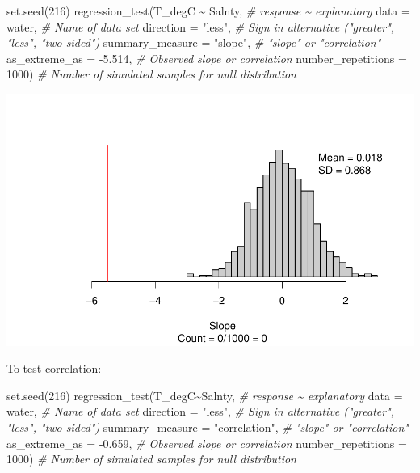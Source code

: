\documentclass[
]{report}
\newenvironment{Shaded}{\begin{snugshade}}{\end{snugshade}}
\newcommand{\AttributeTok}[1]{\textcolor[rgb]{0.77,0.63,0.00}{#1}}
\newcommand{\CommentTok}[1]{\textcolor[rgb]{0.56,0.35,0.01}{\textit{#1}}}
\newcommand{\DecValTok}[1]{\textcolor[rgb]{0.00,0.00,0.81}{#1}}
\newcommand{\FloatTok}[1]{\textcolor[rgb]{0.00,0.00,0.81}{#1}}
\newcommand{\FunctionTok}[1]{\textcolor[rgb]{0.00,0.00,0.00}{#1}}
\newcommand{\NormalTok}[1]{#1}
\newcommand{\SpecialCharTok}[1]{\textcolor[rgb]{0.00,0.00,0.00}{#1}}
\newcommand{\StringTok}[1]{\textcolor[rgb]{0.31,0.60,0.02}{#1}}
\begin{document}
\begin{Shaded}
\begin{Highlighting}[]
\FunctionTok{set.seed}\NormalTok{(}\DecValTok{216}\NormalTok{)}
\FunctionTok{regression\_test}\NormalTok{(T\_degC }\SpecialCharTok{\textasciitilde{}}\NormalTok{ Salnty, }\CommentTok{\# response \textasciitilde{} explanatory}
               \AttributeTok{data =}\NormalTok{ water, }\CommentTok{\# Name of data set}
               \AttributeTok{direction =} \StringTok{"less"}\NormalTok{, }\CommentTok{\# Sign in alternative ("greater", "less", "two{-}sided")}
               \AttributeTok{summary\_measure =} \StringTok{"slope"}\NormalTok{, }\CommentTok{\# "slope" or "correlation"}
               \AttributeTok{as\_extreme\_as =} \SpecialCharTok{{-}}\FloatTok{5.514}\NormalTok{, }\CommentTok{\# Observed slope or correlation}
               \AttributeTok{number\_repetitions =} \DecValTok{1000}\NormalTok{) }\CommentTok{\# Number of simulated samples for null distribution}
\end{Highlighting}
\end{Shaded}

\begin{center}\includegraphics[width=0.7\linewidth]{13-LN013-regression_files/figure-latex/unnamed-chunk-5-1} \end{center}

To test correlation:

\begin{Shaded}
\begin{Highlighting}[]
\FunctionTok{set.seed}\NormalTok{(}\DecValTok{216}\NormalTok{)}
\FunctionTok{regression\_test}\NormalTok{(T\_degC}\SpecialCharTok{\textasciitilde{}}\NormalTok{Salnty, }\CommentTok{\# response \textasciitilde{} explanatory}
               \AttributeTok{data =}\NormalTok{ water, }\CommentTok{\# Name of data set}
               \AttributeTok{direction =} \StringTok{"less"}\NormalTok{, }\CommentTok{\# Sign in alternative ("greater", "less", "two{-}sided")}
               \AttributeTok{summary\_measure =} \StringTok{"correlation"}\NormalTok{, }\CommentTok{\# "slope" or "correlation"}
               \AttributeTok{as\_extreme\_as =} \SpecialCharTok{{-}}\FloatTok{0.659}\NormalTok{, }\CommentTok{\# Observed slope or correlation}
               \AttributeTok{number\_repetitions =} \DecValTok{1000}\NormalTok{) }\CommentTok{\# Number of simulated samples for null distribution}
\end{Highlighting}
\end{Shaded}
\end{document}
